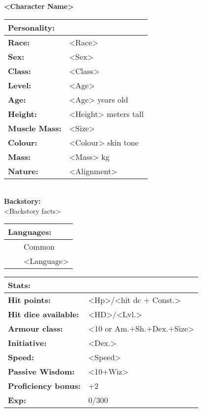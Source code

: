 \documentclass[11pt]{article}
\newcommand{\tabitem}{~~\llap{--}~~}
\begin{document}
	\begin{center}
\Huge \textbf{<Character Name>}
	\end{center}
	\begin{multicols}{2}
\noindent \begin{tabularx}{\linewidth}{@{}l l}
\Large \textbf{Personality:} 	& 						\\
\hline
\textbf{Race:} 					& <Race>	 			\\
\textbf{Sex:} 					& <Sex> 				\\
\textbf{Class:}					& <Class>				\\
\textbf{Level:} 				& <Age>					\\
\textbf{Age:} 					& <Age> years old		\\
\textbf{Height:} 				& <Height> meters tall 	\\
\textbf{Muscle Mass:} 			& <Size> 				\\
\textbf{Colour:} 				& <Colour> skin tone 	\\
\textbf{Mass:} 					& <Mass> kg		 		\\
\textbf{Nature:} 				& <Alignment>
		\end{tabularx} \\
\textbf{Backstory:} \\
<Backstory facts>

\noindent \begin{tabularx}{\linewidth}{@{}l}
{\Large \textbf{Languages:}} \\
\hline
\tabitem Common \\
\tabitem <Language>
		\end{tabularx}

\vspace{4mm}

\noindent \begin{tabularx}{\linewidth}{@{}l l}
\Large \textbf{Stats:}		 	& 									\\
\hline
\textbf{Hit points:} 			& <Hp>/<hit dc $+$ Const.> 			\\
\textbf{Hit dice available:}	& <HD>/<Lvl.>						\\
\textbf{Armour class:} 			& <10 or Am.$+$Sh.$+$Dex.$+$Size> 	\\
\textbf{Initiative:} 			& <Dex.>							\\
\textbf{Speed:} 				& <Speed>	 						\\
\textbf{Passive Wisdom:} 		& <10$+$Wiz>	 					\\
\textbf{Proficiency bonus:}		& +2								\\
\textbf{Exp:} 					& 0/300
		\end{tabularx}


\end{multicols}
\end{document}
